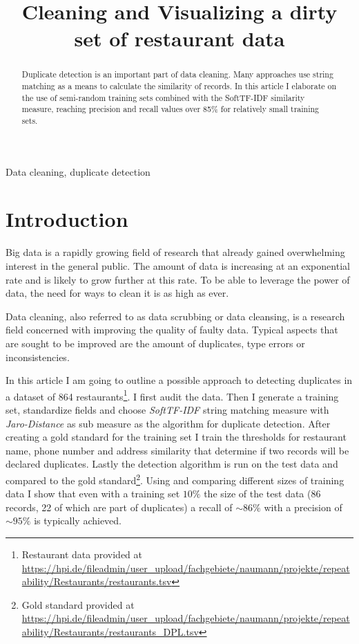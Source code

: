 \documentclass[conference]{IEEEtran}
\newcommand{\unsim}{\mathord{\sim}}
\begin{document}
\title{Cleaning and Visualizing a dirty set of restaurant data}


\author{
}

\maketitle

\begin{abstract}
Duplicate detection is an important part of data cleaning. Many approaches use string matching as a means to calculate the similarity of records. In this article I elaborate on the use of semi-random training sets combined with the SoftTF-IDF similarity measure, reaching precision and recall values over 85\% for relatively small training sets.
\end{abstract}

\begin{IEEEkeywords}
Data cleaning, duplicate detection
\end{IEEEkeywords}

\section{Introduction}
Big data is a rapidly growing field of research that already gained overwhelming interest in the general public. The amount of data is increasing at an exponential rate and is likely to grow further at this rate. To be able to leverage the power of data, the need for ways to clean it is as high as ever.

Data cleaning, also referred to as data scrubbing or data cleansing, is a research field concerned with improving the quality of faulty data. Typical aspects that are sought to be improved are the amount of duplicates, type errors or inconsistencies\cite{Bilenko.2003}.

In this article I am going to outline a possible approach to detecting duplicates in a dataset of 864 
restaurants\footnote{Restaurant data provided at \url{https://hpi.de/fileadmin/user_upload/fachgebiete/naumann/projekte/repeatability/Restaurants/restaurants.tsv}}.
I first audit the data. Then  I generate a training set, standardize fields and choose \emph{SoftTF-IDF} string matching measure with \emph{Jaro-Distance} as sub measure as the algorithm for duplicate detection. After creating a gold standard for the training set I train the thresholds for restaurant name, phone number and address similarity that determine if two records will be declared duplicates. Lastly the detection algorithm is run on the test data and compared to the gold 
standard\footnote{Gold standard provided at \url{https://hpi.de/fileadmin/user_upload/fachgebiete/naumann/projekte/repeatability/Restaurants/restaurants_DPL.tsv}}.
Using and comparing different sizes of training data I show that even with a training set $10\%$ the size of the test data (86 records, 22 of which are part of duplicates) a recall of $\unsim86\%$ with a precision of $\unsim95\%$ is typically achieved.
\end{document}
